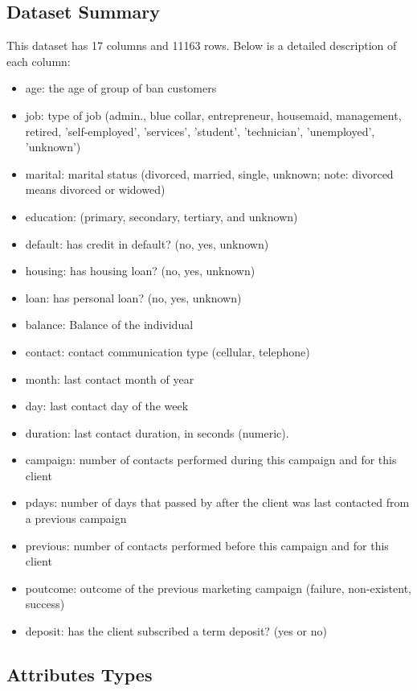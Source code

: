 \documentclass[12pt]{article}
\begin{document}
\subsection{Dataset Summary}
This dataset has 17 columns and 11163 rows. Below is a detailed description of each column: 

\begin{itemize}

\item age: the age of group of ban customers
\item	job: type of job (admin., blue collar, entrepreneur, housemaid, management, retired, 'self-employed', 'services', 'student', 'technician', 'unemployed', 'unknown')
\item	marital: marital status (divorced, married, single, unknown; note: divorced means divorced or widowed)
\item	education: (primary, secondary, tertiary, and unknown)
\item	default: has credit in default? (no, yes, unknown)
\item	housing: has housing loan? (no, yes, unknown)
\item	loan: has personal loan? (no, yes, unknown)
\item	balance: Balance of the individual
\item	contact: contact communication type (cellular, telephone)
\item	month: last contact month of year 
\item	day: last contact day of the week 
\item	duration: last contact duration, in seconds (numeric). 
\item	campaign: number of contacts performed during this campaign and for this client 
\item pdays: number of days that passed by after the client was last contacted from a previous campaign 
\item	previous: number of contacts performed before this campaign and for this client 
\item poutcome: outcome of the previous marketing campaign (failure, non-existent, success)
\item	deposit: has the client subscribed a term deposit? (yes or no)
\end{itemize}

\newpage
\subsection{Attributes Types}
\end{document}
